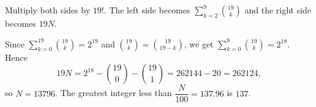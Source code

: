 Multiply both sides by $19!$. The left side becomes $\displaystyle\sum_{k=2}^{9}\binom{19}{k}$ and the right side becomes $19N$.

Since $\displaystyle\sum_{k=0}^{19}\binom{19}{k}=2^{19}$ and $\binom{19}{k}=\binom{19}{19-k}$, we get $\displaystyle\sum_{k=0}^{9}\binom{19}{k}=2^{18}$. Hence
\[19N=2^{18}-\binom{19}{0}-\binom{19}{1}=262144-20=262124,\]
so $N=13796$. The greatest integer less than $\dfrac N{100}=137.96$ is $\boxed{137}$.
